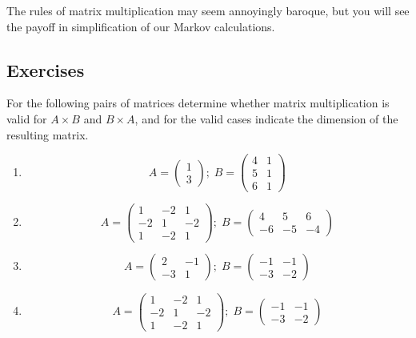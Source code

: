 \documentclass[
  letterpaper,
  DIV=11,
  numbers=noendperiod]{scrreprt}
\begin{document}
The rules of matrix multiplication may seem annoyingly baroque, but you
will see the payoff in simplification of our Markov calculations.

\hypertarget{exercises-28}{%
\subsection{Exercises}\label{exercises-28}}

For the following pairs of matrices determine whether matrix
multiplication is valid for \(A \times B\) and \(B \times A\), and for
the valid cases indicate the dimension of the resulting matrix.

\begin{enumerate}
\def\labelenumi{\arabic{enumi}.}
\item
  \[ 
  A =  \left(\begin{array}{c}1 \\ 3 \end{array}\right);  \;  B = \left(\begin{array}{cc}4 & 1 \\5 & 1 \\6 & 1\end{array}\right)
  \]
\item
  \[ 
  A =   \left(\begin{array}{ccc}1 & -2 & 1 \\-2 & 1 & -2 \\1 & -2 & 1\end{array}\right);  \;  B = \left(\begin{array}{ccc}4 & 5 & 6 \\-6 & -5 & -4\end{array}\right)
  \]
\item
  \[ 
  A =  \left(\begin{array}{cc}2 & -1 \\-3 & 1\end{array}\right)  ;  \;  B = \left(\begin{array}{cc}-1 & -1 \\-3 & -2\end{array}\right)
  \]
\item
  \[ A =   \left(\begin{array}{ccc}1 & -2 & 1 \\-2 & 1 & -2 \\1 & -2 & 1\end{array}\right)  ;  \;  B =  \left(\begin{array}{cc}-1 & -1 \\-3 & -2\end{array}\right)
\]
\end{enumerate}
\end{document}
